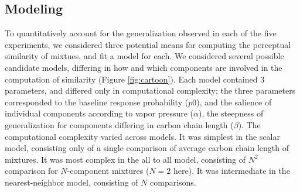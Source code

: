 \subsection{Modeling}
\label{sec:results_modeling}
To quantitatively account for the generalization observed in each of the five experiments, we considered three potential means for computing the perceptual similarity of mixtues, and fit a model for each.  
We considered several possible candidate models, differing in how and which components are involved in the computation of similarity (Figure \ref{fig:cartoon}).  
Each model contained 3 parameters, and differed only in computational complexity; the three parameters corresponded to the baseline response probability ($p0$), and the salience of individual components according to vapor pressure ($\alpha$), the steepness of generalization for components differing in carbon chain length ($\beta$).  
The computational complexity varied across models.  It was simplest in the scalar model, consisting only of a single comparison of average carbon chain length of mixtures.  It was most complex in the all to all model, consisting of $N^2$ comparison for $N$-component mixtures ($N=2$ here).  It was intermediate in the nearest-neighbor model, consisting of $N$ comparisons.  
